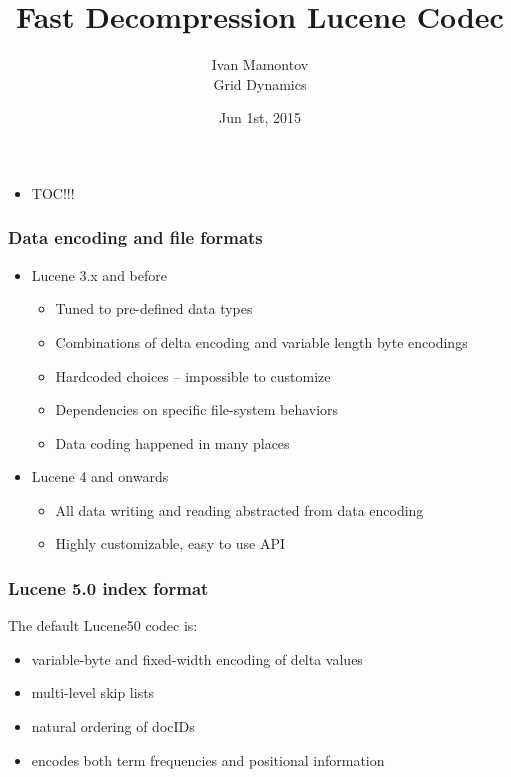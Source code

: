 \documentclass{beamer}
\title{Fast Decompression Lucene Codec}
\author{Ivan Mamontov\\ Grid Dynamics}
\institute{Berlin Buzzwords}
\date{Jun 1st, 2015}
\begin{document}
	\begin{frame}
		\titlepage
	\end{frame}
	\begin{frame}
    		\begin{itemize}
    		    \item TOC!!!
		\end{itemize}
  	\end{frame}
  	\begin{frame}
  		\frametitle{Data encoding and file formats}
  		\begin{itemize}
  			\item Lucene 3.x and before
  			\begin{itemize}
  				\item Tuned to pre-defined data types
  				\item Combinations of delta encoding and variable length byte encodings
  				\item Hardcoded choices -- impossible to customize
  				\item Dependencies on specific file-system behaviors
  				\item Data coding happened in many places
  			\end{itemize}
	  			\item Lucene 4 and onwards
  					\begin{itemize}
  						\item All data writing and reading abstracted from data encoding
  						\item Highly customizable, easy to use API
  					\end{itemize}		
  		\end{itemize}
  	\end{frame}
  	\begin{frame}
  		\frametitle{Lucene 5.0 index format}
  		The default Lucene50 codec is:
  		\begin{itemize}
  			\item variable-byte and fixed-width encoding of delta values
  			\item multi-level skip lists
  			\item natural ordering of docIDs
  			\item encodes both term frequencies and positional information
  		\end{itemize}
  	\end{frame}
\end{document}
